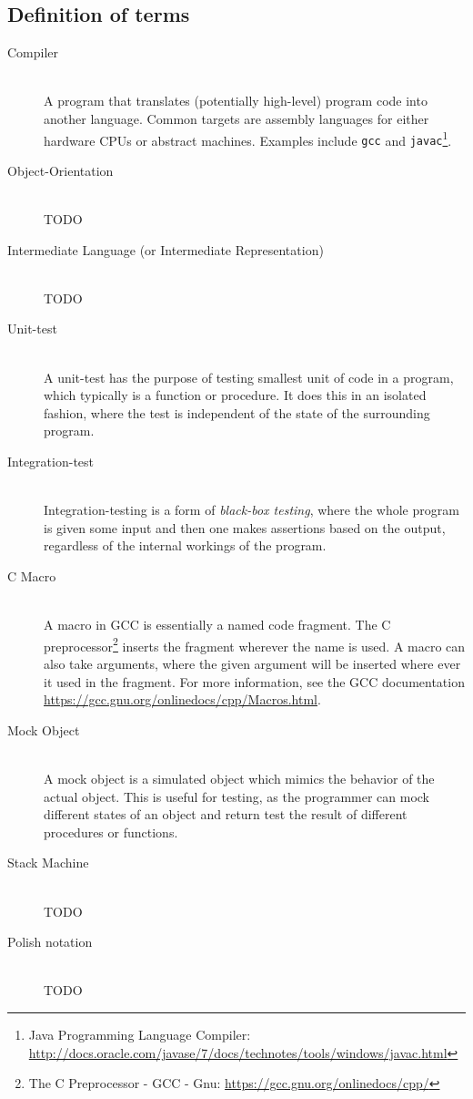 \subsection{Definition of terms}
\begin{description}
\item[Compiler] \hfill \\
  A program that translates (potentially high-level) program code into
  another language. Common targets are assembly languages for either
  hardware CPUs or abstract machines. Examples include
  {\tt gcc}\cite{gnu:gcc} and  {\tt javac}\footnote{Java Programming Language
    Compiler: \url{http://docs.oracle.com/javase/7/docs/technotes/tools/windows/javac.html}}.

\item[Object-Orientation] \hfill \\
  TODO

\item[Intermediate Language (or Intermediate Representation)] \hfill \\
  TODO

\item[Unit-test] \hfill \\
  A unit-test has the purpose of testing smallest unit of code in a
  program, which typically is a function or procedure. It does this in
  an isolated fashion, where the test is independent of the state of
  the surrounding program.

\item[Integration-test] \hfill \\
  Integration-testing is a form of {\it black-box testing}, where the
  whole program is given some input and then one makes assertions
  based on the output, regardless of the internal workings of the
  program.

\item[C Macro] \hfill \\
  A macro in GCC is essentially a named code fragment. The C
  preprocessor\footnote{The C Preprocessor - GCC - Gnu:
    \url{https://gcc.gnu.org/onlinedocs/cpp/}} inserts the fragment
  wherever the name is used. A macro can also take arguments, where
  the given argument will be inserted where ever it used in the
  fragment. For more information, see the GCC documentation
  \url{https://gcc.gnu.org/onlinedocs/cpp/Macros.html}.

\item[Mock Object] \hfill \\
  A mock object is a simulated object which mimics the behavior of the
  actual object. This is useful for testing, as the programmer can
  mock different states of an object and return test the result of
  different procedures or functions. %

\item[Stack Machine] \hfill \\
  TODO

\item[Polish notation] \hfill \\
  TODO

\end{description}


